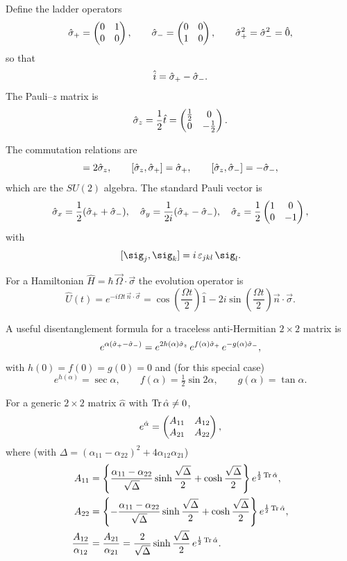 Define the ladder operators
\[
\hat{\sigma}_{+} = \begin{pmatrix}0 & 1 \\ 0 & 0\end{pmatrix},\qquad
\hat{\sigma}_{-} = \begin{pmatrix}0 & 0 \\ 1 & 0\end{pmatrix},\qquad
\hat{\sigma}_{+}^{2} = \hat{\sigma}_{-}^{2} = \hat{0},
\]
so that
\[
\hat{i} = \hat{\sigma}_{+} - \hat{\sigma}_{-}.
\]
The Pauli--$z$ matrix is
\[
\hat{\sigma}_{z} = \frac{1}{2}\hat{t} = \begin{pmatrix}\tfrac{1}{2} & 0 \\ 0 & -\tfrac{1}{2}\end{pmatrix}.
\]

The commutation relations are
\begin{equation}
[\spp,\smm] = 2\sigz,\qquad
[\sigz,\spp] = \spp,\qquad
[\sigz,\smm] = -\smm,
\label{eq:1.2.8}
\end{equation}
which are the $SU(2)$ algebra. The standard Pauli vector is
\[
\hat{\sigma}_{x} = \frac{1}{2}(\hat{\sigma}_{+}+\hat{\sigma}_{-}),\quad
\hat{\sigma}_{y} = \frac{1}{2i}(\hat{\sigma}_{+}-\hat{\sigma}_{-}),\quad
\hat{\sigma}_{z} = \frac{1}{2}\begin{pmatrix}1 & 0 \\ 0 & -1\end{pmatrix},
\]
with
\[
[\sig_{j},\sig_{k}] = i\,\varepsilon_{jkl}\,\sig_{l}.
\]

For a Hamiltonian $\hat{H} = \hbar\,\vec{\Omega}\!\cdot\!\vec{\sigma}$ the evolution operator is
\[
\hat{U}(t) = e^{-i\Omega t\,\vec{n}\!\cdot\!\vec{\sigma}}
= \cos\!\left(\frac{\Omega t}{2}\right)\hat{1}
- 2i\sin\!\left(\frac{\Omega t}{2}\right)\vec{n}\!\cdot\!\vec{\sigma}.
\]

A useful disentanglement formula for a traceless anti-Hermitian $2\times 2$ matrix is
\[
e^{\alpha(\hat{\sigma}_{+}-\hat{\sigma}_{-})}
= e^{2h(\alpha)\hat{\sigma}_{z}}\,e^{f(\alpha)\hat{\sigma}_{+}}\,e^{-g(\alpha)\hat{\sigma}_{-}},
\]
with $h(0)=f(0)=g(0)=0$ and (for this special case)
\[
e^{h(\alpha)} = \sec\alpha,\qquad
f(\alpha) = \tfrac{1}{2}\sin 2\alpha,\qquad
g(\alpha) = \tan\alpha.
\]

For a generic $2\times 2$ matrix $\hat{\alpha}$ with $\operatorname{Tr}\hat{\alpha}\neq 0$,
\[
e^{\hat{\alpha}} = \begin{pmatrix}A_{11} & A_{12} \\ A_{21} & A_{22}\end{pmatrix},
\]
where (with $\Delta = (\alpha_{11}-\alpha_{22})^{2}+4\alpha_{12}\alpha_{21}$)
\begin{align*}
A_{11} &= \left\{\frac{\alpha_{11}-\alpha_{22}}{\sqrt{\Delta}}\sinh\frac{\sqrt{\Delta}}{2}
           + \cosh\frac{\sqrt{\Delta}}{2}\right\}e^{\frac{1}{2}\operatorname{Tr}\hat{\alpha}},\\
A_{22} &= \left\{-\frac{\alpha_{11}-\alpha_{22}}{\sqrt{\Delta}}\sinh\frac{\sqrt{\Delta}}{2}
           + \cosh\frac{\sqrt{\Delta}}{2}\right\}e^{\frac{1}{2}\operatorname{Tr}\hat{\alpha}},\\
\frac{A_{12}}{\alpha_{12}} &= \frac{A_{21}}{\alpha_{21}}
 = \frac{2}{\sqrt{\Delta}}\sinh\frac{\sqrt{\Delta}}{2}\,e^{\frac{1}{2}\operatorname{Tr}\hat{\alpha}}.
\end{align*}

